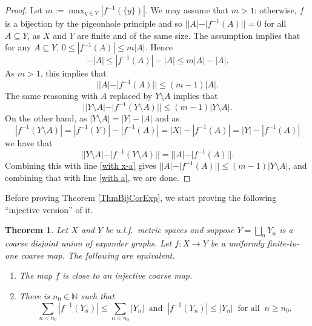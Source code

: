 \documentclass[11pt]{amsart}
\newcommand{\N}{\mathbb{N}}
\numberwithin{equation}{section}
\newtheorem{theorem}{Theorem}[section]
\newtheorem{lemma}[theorem]{Lemma}
\theoremstyle{definition}
\theoremstyle{remark}
\numberwithin{equation}{section}
\begin{document}

\begin{proof}
 Let $m:=\max_{y\in Y}|f^{-1}(\{y\})|$. We may assume that $m>1$: otherwise, $f$ is a bijection by the pigeonhole principle and so $||A|-|f^{-1}(A)||=0$ for all $A\subseteq Y$, as $X$ and $Y$ are finite and of the same size. The assumption implies that for any $A\subseteq Y$, $0\leq |f^{-1}(A)|\leq m|A|$. Hence 
\[
-|A|\leq |f^{-1}(A)|-|A|\leq m|A|-|A|.
\]
As $m>1$, this implies that 
\begin{equation}\label{with a}
||A|-|f^{-1}(A)||\leq (m-1)|A|.
\end{equation}
The same reasoning with $A$ replaced by $Y\setminus A$ implies that 
\begin{equation}\label{with x-a}
||Y\setminus A|-|f^{-1}(Y\setminus A)||\leq (m-1)|Y\setminus A|.
\end{equation}
On the other hand, as $|Y\setminus A|=|Y|-|A|$ and as 
\[
|f^{-1}(Y\setminus A)|=|f^{-1}(Y)|-|f^{-1}(A)|=|X|-|f^{-1}(A)|=|Y|-|f^{-1}(A)|
\]
we have that 
\[
||Y\setminus A|-|f^{-1}(Y\setminus A)||=||A|-|f^{-1}(A)||.
\]
Combining this with line \eqref{with x-a} gives $||A|-|f^{-1}(A)||\leq (m-1)|Y\setminus A|$, and combining that with line \eqref{with a}, we are done.
 \end{proof}

 Before proving Theorem \ref{ThmBijCorExp}, we start proving the following ``injective version'' of it.
 
\begin{theorem}\label{ThmINJCorExp}
 Let $X$ and $Y$ be u.l.f.\ metric spaces and suppose $Y=\bigsqcup_nY_n$ is a coarse disjoint union of expander graphs. Let $f\colon X\to Y$ be a uniformly finite-to-one coarse map. The following are equivalent.
\begin{enumerate}
\item \label{ThmINJCorExpItem1} The map $f$ is close to an injective coarse map.
\item \label{ThmINJCorExpItem2} There is $n_0\in\N$ such that 
 \[\sum_{n<n_0}|f^{-1}(Y_n)|\leq \sum_{n<n_0}|Y_n| \ \text{ and } \ |f^{-1}(Y_n)|\leq |Y_{n}|\ \text{ for all } \ n\geq n_0.\]
 \end{enumerate}
\end{theorem}
 
\end{document}
